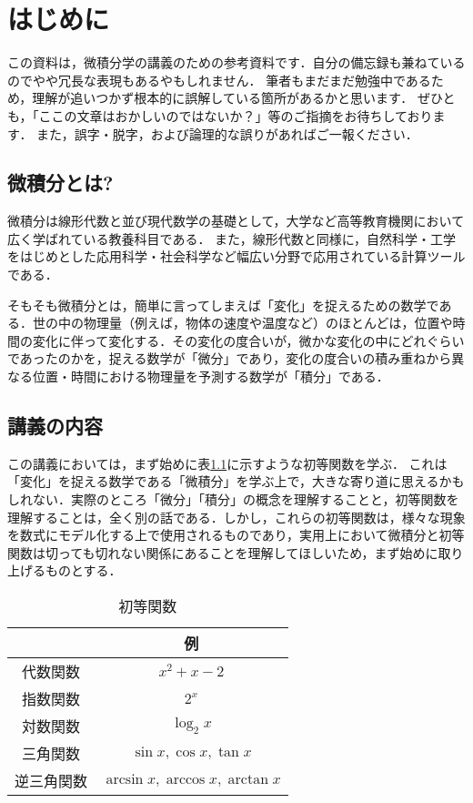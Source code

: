 \chapter{はじめに}
この資料は，微積分学の講義のための参考資料です．自分の備忘録も兼ねているのでやや冗長な表現もあるやもしれません．
筆者もまだまだ勉強中であるため，理解が追いつかず根本的に誤解している箇所があるかと思います．
ぜひとも，「ここの文章はおかしいのではないか？」等のご指摘をお待ちしております．
また，誤字・脱字，および論理的な誤りがあればご一報ください．

\section{微積分とは?}
微積分は線形代数と並び現代数学の基礎として，大学など高等教育機関において広く学ばれている教養科目である．
また，線形代数と同様に，自然科学・工学をはじめとした応用科学・社会科学など幅広い分野で応用されている計算ツールである．

そもそも微積分とは，簡単に言ってしまえば「変化」を捉えるための数学である．世の中の物理量（例えば，物体の速度や温度など）のほとんどは，位置や時間の変化に伴って変化する．その変化の度合いが，微かな変化の中にどれぐらいであったのかを，捉える数学が「微分」であり，変化の度合いの積み重ねから異なる位置・時間における物理量を予測する数学が「積分」である．


\section{講義の内容}
この講義においては，まず始めに表\ref{table:ele_func}に示すような初等関数を学ぶ．
これは「変化」を捉える数学である「微積分」を学ぶ上で，大きな寄り道に思えるかもしれない．実際のところ「微分」「積分」の概念を理解することと，初等関数を理解することは，全く別の話である．しかし，これらの初等関数は，様々な現象を数式にモデル化する上で使用されるものであり，実用上において微積分と初等関数は切っても切れない関係にあることを理解してほしいため，まず始めに取り上げるものとする．

\begin{table}[!h]
	\centering
	\caption{初等関数}
	\label{table:ele_func}
	\begin{tabular}{c|c}
		& 例 \\
		\hline
		代数関数 & $x^2 + x - 2$ \\
		指数関数 & $2^x$ \\
		対数関数 & $\log_2{x}$ \\
		三角関数 & $\sin x, \cos x, \tan x$ \\
		逆三角関数 & $\arcsin x, \arccos x, \arctan x$ \\
	\end{tabular}
\end{table}

